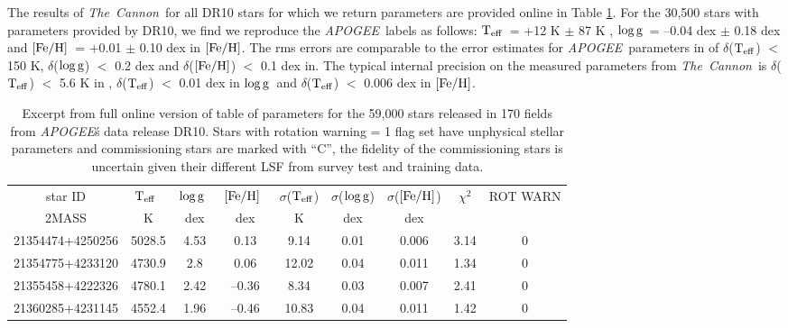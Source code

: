 \documentclass[12pt, preprint]{aastex}
\newcommand{\teff}{\mbox{$\rm T_{eff}$}}
\newcommand{\feh}{\mbox{$\rm [Fe/H]$}}
\newcommand{\logg}{\mbox{$\rm \log g$}}
\newcommand{\tc}{\textsl{The~Cannon}}
\newcommand{\apogee}{\textsl{APOGEE}}
\begin{document}
The results of \tc\ for all DR10 stars for which we return parameters are provided online in Table \ref{tab:online}. For the 30,500 stars with parameters provided by DR10, we find we reproduce the \apogee\ labels as follows: \teff\ = +12 K $\pm$ 87 K ,  \logg\ = --0.04 dex $\pm$  0.18 dex and \feh\ = +0.01 $\pm$ 0.10 dex in \feh. The rms errors are comparable to the error estimates for \apogee\ parameters in \citet{Meszaros2013} of $\delta$(\teff) $<$ 150 K, $\delta$(\logg) $<$  0.2 dex and $\delta$(\feh) $<$  0.1 dex in.  The typical internal precision on the measured parameters from \tc\ is  $\delta$(\teff) $<$ 5.6 K in ,  $\delta$(\teff) $<$ 0.01 dex in \logg\ and  $\delta$(\teff) $<$ 0.006 dex in \feh.


\begin{table}[!h]
\small{
\centering
\caption{Excerpt from full online version of table of parameters for the 59,000 stars released in 170 fields from \apogee\'s data release DR10. Stars with rotation warning = 1 flag set have unphysical stellar parameters and commissioning stars are marked with ``C'', the fidelity of the commissioning stars is uncertain given their different LSF from survey test and training data.} \begin{tabular}{| c | c | c |  c | c | c |  c | c | c |} %
\hline
star ID & \teff\ & \logg\ & \feh\ & $\sigma$(\teff) & $\sigma$(\logg) & $\sigma$(\feh) & $\chi^2$ & \tiny{ROT WARN}\\
{2MASS} &  K &  dex  & dex & K & dex & dex & & \\    
\hline
21354474+4250256 & 5028.5 & 4.53 & 0.13 & 9.14 & 0.01 & 0.006 & 3.14 & 0\\
21354775+4233120 & 4730.9 & 2.8 & 0.06 & 12.02 & 0.04 & 0.011 & 1.34 & 0\\
21355458+4222326 & 4780.1 & 2.42 & --0.36 & 8.34 & 0.03 & 0.007 & 2.41 & 0\\
21360285+4231145 &  4552.4 &  1.96 & --0.46  & 10.83 & 0.04 & 0.011 &  1.42 &  0\\
 \hline
\end{tabular}
\label{tab:online} }
\end{table}  
 
\end{document}
